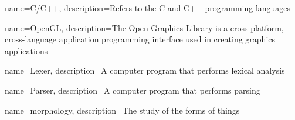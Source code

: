 {
	name=C/C++, 
	description={Refers to the C and C++ programming languages}
}

{
	name=OpenGL, 
	description={The Open Graphics Library is a cross-platform, cross-language application programming interface used in creating graphics applications}
}

{
	name=Lexer, 
	description={A computer program that performs lexical analysis}
}

{
	name=Parser,
	description={A computer program that performs parsing}
}

{
	name=morphology, 
	description={The study of the forms of things}
}

